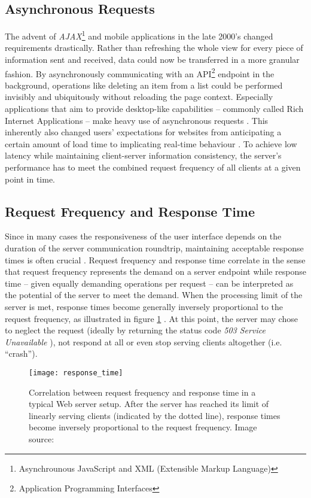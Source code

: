 \subsection{Asynchronous Requests}
The advent of \textit{AJAX}\footnote{Asynchrounous JavaScript and XML (Extensible Markup Language)} and mobile applications in the late 2000's changed requirements drastically. Rather than refreshing the whole view for every piece of information sent and received, data could now be transferred in a more granular fashion. By asynchronously communicating with an API\footnote{Application Programming Interfaces} endpoint in the background, operations like deleting an item from a list could be performed invisibly and ubiquitously without reloading the page context. Especially applications that aim to provide desktop-like capabilities -- commonly called Rich Internet Applications -- make heavy use of asynchronous requests \cite[p. 4]{Sencha2011}. This inherently also changed users' expectations for websites from anticipating a certain amount of load time to implicating real-time behaviour \cite{Garrett2005}. To achieve low latency while maintaining client-server information consistency, the server's performance has to meet the combined request frequency of all clients at a given point in time.

\subsection{Request Frequency and Response Time}
Since in many cases the responsiveness of the user interface depends on the duration of the server communication roundtrip, maintaining acceptable response times is often crucial \cite[p. 1]{Nadimpalli2000}. Request frequency and response time correlate in the sense that request frequency represents the demand on a server endpoint while response time -- given equally demanding operations per request -- can be interpreted as the potential of the server to meet the demand. When the processing limit of the server is met, response times become generally inversely proportional to the request frequency, as illustrated in figure \ref{fig:response_time} \cite{response_time}. At this point, the server may chose to neglect the request (ideally by returning the status code \textit{503 Service Unavailable} \cite{http}), not respond at all or even stop serving clients altogether (i.e. ``crash'').

\begin{figure}
\centering\small
\setlength{\tabcolsep}{0mm}
  \texttt{[image: response\_time]}
\caption{
Correlation between request frequency and response time in a typical Web server setup. After the server has reached its limit of linearly serving clients (indicated by the dotted line), response times become inversely proportional to the request frequency. Image source: \cite{response_time}
}
\label{fig:response_time}
\end{figure}

